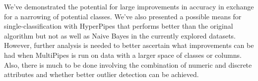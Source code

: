 We've demonstrated the potential for large improvements in accuracy in exchange for a narrowing of potential classes. We've also presented a possible means for single-classification with HyperPipes that performs better than the original algorithm but not as well as Naive Bayes in the currently explored datasets. However, further analysis is needed to better ascertain what improvements can be had when MultiPipes is run on data with a larger space of classes or columns. Also, there is much to be done involving the combination of numeric and discrete attributes and whether better outlier detection can be achieved.
